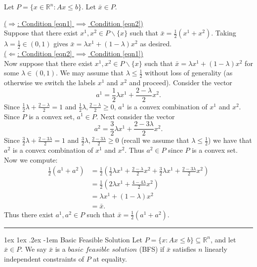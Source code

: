 \documentclass[11pt]{article}
\makeatletter
\renewcommand\paragraph{\@startsection{paragraph}{4}{0mm}%
                                    {1ex \@plus1ex \@minus.2ex}%
                                    {-1em}%
                                    {\normalfont\normalsize\bfseries}}
\newenvironment{proof}{{\bf Proof:  }}{\hfill\rule{2mm}{2mm}}
\newcommand{\R}{\ensuremath{\mathbb R}}
\makeatother
\begin{document}
\begin{proof}
Let $P = \{x \in \R^n : Ax \leq b\}$. Let $\bar{x} \in P$.

\underline{\noindent ($\Rightarrow$: Condition \ref{eqn1} $\implies$ Condition \ref{eqn2})} \\
Suppose that there exist $x^1, x^2 \in P\backslash\{x\}$ such that $\bar{x} = \frac{1}{2}(x^1 + x^2)$. Taking $\lambda = \frac{1}{2} \in (0,1)$ gives $\bar{x} = \lambda x^1 + (1-\lambda)x^2$ as desired. \\

\noindent \underline{\noindent ($\Leftarrow$: Condition \ref{eqn2} $\implies$ Condition \ref{eqn1})} \\
Now suppose that there exist $x^1, x^2 \in P\backslash\{x\}$ such that $\bar{x} = \lambda x^1 + (1-\lambda)x^2$ for some $\lambda \in (0,1)$.
We may assume that $\lambda \leq \frac{1}{2}$ without loss of generality (as otherwise we switch the labels $x^1$ and $x^2$ and proceed). Consider the vector
$$ a^1 = \frac{1}{2} \lambda x^1 + \frac{2-\lambda}{2} x^2.$$
Since $\frac{1}{2} \lambda + \frac{2-\lambda}{2} = 1$ and $\frac{1}{2}\lambda, \frac{2-\lambda}{2} \geq 0$, $a^1$ is a convex combination of $x^1$ and $x^2$.
Since $P$ is a convex set, $a^1 \in P$. Next consider the vector
$$ a^2 = \frac{3}{2} \lambda x^1 + \frac{2-3\lambda}{2}x^2.$$
Since $\frac{3}{2} \lambda + \frac{2-3\lambda}{2} = 1$ and $\frac{3}{2}\lambda, \frac{2-3\lambda}{2} \geq 0$ (recall we assume that $\lambda \leq \frac{1}{2}$) we have that $a^2$ is a convex combination of $x^1$ and $x^2$. Thus $a^2 \in P$ since $P$ is a convex set. Now we compute:
\begin{align*}
\frac{1}{2}(a^1 + a^2) &= \frac{1}{2}(\frac{1}{2}\lambda x^1 + \frac{2-\lambda}{2}x^2 + \frac{3}{2}\lambda x^1 + \frac{2-3\lambda}{2}x^2) \\
&= \frac{1}{2}(2\lambda x^1 + \frac{4-4\lambda}{2}x^2) \\
&=\lambda x^1 + (1-\lambda)x^2 \\
&=\bar{x}.
\end{align*}
Thus there exist $a^1,a^2 \in P$ such that $\bar{x} = \frac{1}{2}(a^1 + a^2)$.
\end{proof}
\paragraph{Basic Feasible Solution} Let $P = \{ x : Ax \leq b \} \subseteq \R^n$, and let $\bar{x} \in P$. We say $\bar{x}$ is a $\textit{basic feasible solution}$ (BFS) if $\bar{x}$ satisfies $n$ linearly independent constraints of $P$ at equality.
\end{document}
